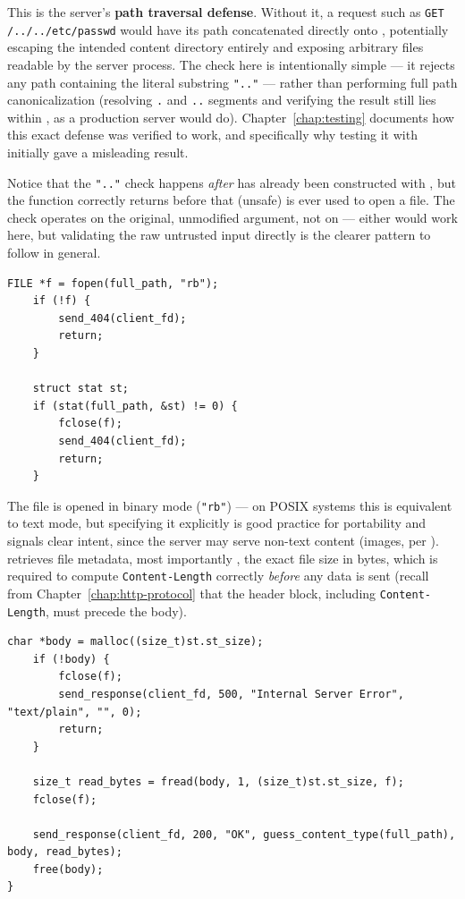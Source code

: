 This is the server's \textbf{path traversal defense}. Without it, a request such as \texttt{GET /../../etc/passwd} would have its path concatenated directly onto , potentially escaping the intended content directory entirely and exposing arbitrary files readable by the server process. The check here is intentionally simple --- it rejects any path containing the literal substring \texttt{".."} --- rather than performing full path canonicalization (resolving \texttt{.} and \texttt{..} segments and verifying the result still lies within , as a production server would do). Chapter~\ref{chap:testing} documents how this exact defense was verified to work, and specifically why testing it with  initially gave a misleading result.

\begin{warnbox}
Notice that the \texttt{".."} check happens \emph{after}  has already been constructed with , but the function correctly returns before that (unsafe)  is ever used to open a file. The check operates on the original, unmodified  argument, not on  --- either would work here, but validating the raw untrusted input directly is the clearer pattern to follow in general.
\end{warnbox}

\begin{lstlisting}[style=cstyle]
    FILE *f = fopen(full_path, "rb");
    if (!f) {
        send_404(client_fd);
        return;
    }

    struct stat st;
    if (stat(full_path, &st) != 0) {
        fclose(f);
        send_404(client_fd);
        return;
    }
\end{lstlisting}

The file is opened in binary mode (\texttt{"rb"}) --- on POSIX systems this is equivalent to text mode, but specifying it explicitly is good practice for portability and signals clear intent, since the server may serve non-text content (images, per ).  retrieves file metadata, most importantly , the exact file size in bytes, which is required to compute \texttt{Content-Length} correctly \emph{before} any data is sent (recall from Chapter~\ref{chap:http-protocol} that the header block, including \texttt{Content-Length}, must precede the body).

\begin{lstlisting}[style=cstyle]
    char *body = malloc((size_t)st.st_size);
    if (!body) {
        fclose(f);
        send_response(client_fd, 500, "Internal Server Error", "text/plain", "", 0);
        return;
    }

    size_t read_bytes = fread(body, 1, (size_t)st.st_size, f);
    fclose(f);

    send_response(client_fd, 200, "OK", guess_content_type(full_path), body, read_bytes);
    free(body);
}
\end{lstlisting}

